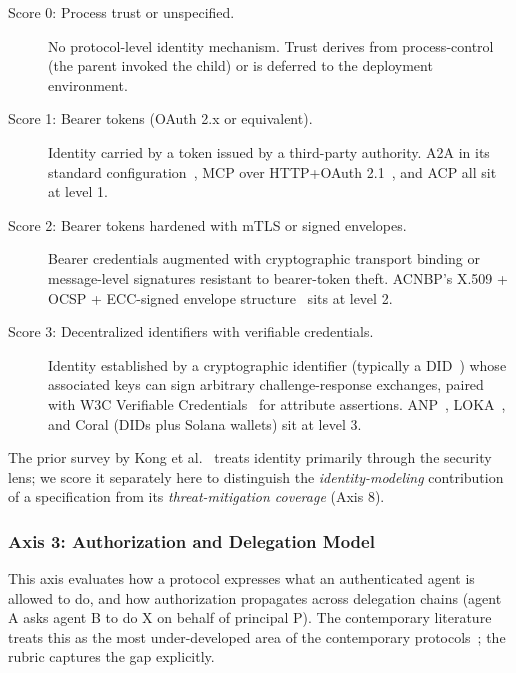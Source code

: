 \begin{description}
  \item[Score 0: Process trust or unspecified.] No
    protocol-level identity mechanism. Trust derives from
    process-control (the parent invoked the child) or is
    deferred to the deployment environment.
  \item[Score 1: Bearer tokens (OAuth 2.x or
    equivalent).] Identity carried by a token issued by a
    third-party authority. A2A in its standard
    configuration~\cite{spec_a2a}, MCP over HTTP+OAuth
    2.1~\cite{spec_mcp}, and ACP all sit at level 1.
  \item[Score 2: Bearer tokens hardened with mTLS or
    signed envelopes.] Bearer credentials augmented with
    cryptographic transport binding or message-level
    signatures resistant to bearer-token theft. ACNBP's
    X.509 + OCSP + ECC-signed envelope
    structure~\cite{spec_acnbp} sits at level 2.
  \item[Score 3: Decentralized identifiers with
    verifiable credentials.] Identity established by a
    cryptographic identifier (typically a
    DID~\cite{w3c_did_core}) whose
    associated keys can sign arbitrary
    challenge-response exchanges, paired with W3C
    Verifiable Credentials~\cite{w3c_vc_data_model} for
    attribute assertions.
    ANP~\cite{spec_anp}, LOKA~\cite{spec_loka}, and Coral
    (DIDs plus Solana wallets) sit at level 3.
\end{description}

The prior survey by Kong et al.~\cite{kong2025communication}
treats identity primarily through the security lens; we
score it separately here to distinguish the
\emph{identity-modeling} contribution of a specification
from its \emph{threat-mitigation coverage} (Axis 8).

\subsubsection{Axis 3: Authorization and Delegation Model}
\label{sec:rubric:axis3}

This axis evaluates how a protocol expresses what an
authenticated agent is allowed to do, and how authorization
propagates across delegation chains (agent A asks agent B
to do X on behalf of principal P). The contemporary
literature treats this as the most under-developed area of
the contemporary protocols~\cite{authz_propagation,
agentic_jwt}; the rubric captures the gap explicitly.

